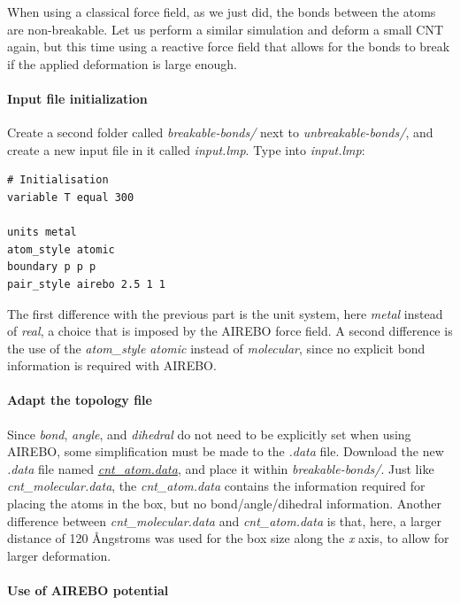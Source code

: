 \documentclass[9pt,tutorial]{livecoms}
\newcommand{\filepath}{https://raw.githubusercontent.com/lammpstutorials/lammpstutorials-article/main/files/}
\begin{document}
When using a classical force field, as we just did, the bonds between the atoms
are non-breakable. Let us perform a similar simulation and deform a small
CNT again, but this time using a reactive force field that allows for the bonds
to break if the applied deformation is large enough.

\paragraph{Input file initialization}
Create a second folder called \textit{breakable-bonds/} next to
\textit{unbreakable-bonds/}, and create a new input file in it called
\textit{input.lmp}. Type into \textit{input.lmp}:
{\normalsize \begin{verbatim}
# Initialisation
variable T equal 300

units metal
atom_style atomic
boundary p p p
pair_style airebo 2.5 1 1
\end{verbatim}}
The first difference with the previous part is the unit system, here
\textit{metal} instead of \textit{real}, a choice that is imposed by the
AIREBO force field. A second difference is the use of the
\textit{atom\_style atomic} instead of \textit{molecular}, since no explicit
bond information is required with AIREBO.

\paragraph{Adapt the topology file}

Since \textit{bond}, \textit{angle}, and \textit{dihedral} do not need to be
explicitly set when using AIREBO, some simplification must be made to the
\textit{.data} file. Download the new \textit{.data}
file named \href{\filepath tutorial2/breakable-bonds/cnt_atom.data}{\textit{cnt\_atom.data}},
and place it within \textit{breakable-bonds/}. Just like \textit{cnt\_molecular.data},
the \textit{cnt\_atom.data} contains the information
required for placing the atoms in the box, but no bond/angle/dihedral information.
Another difference between \textit{cnt\_molecular.data} and \textit{cnt\_atom.data}
is that, here, a larger distance of 120 Ångstroms was used for the box size along
the \textit{x} axis, to allow for larger deformation.

\paragraph{Use of AIREBO potential}
\end{document}
